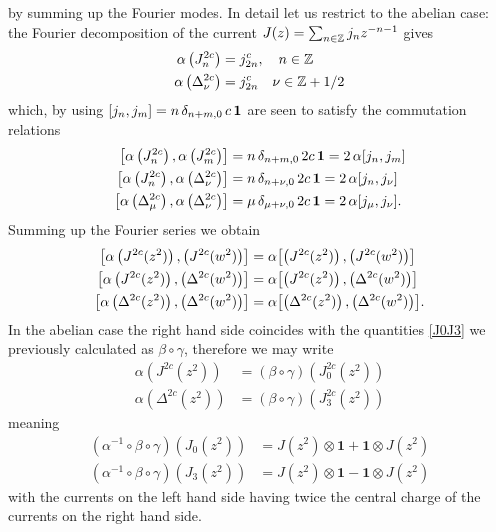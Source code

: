  by summing up the Fourier modes. In detail let us 
 restrict to the abelian case: the Fourier decomposition
 of the current $J(z)=\sum_{n\in\mathbb{Z}}j_n z^{-n-1}$ gives
 \begin{align*}
 \alpha\left(J^{2c}_n\right)&=j_{2n}^c,\quad n\in\mathbb{Z}\\
 \alpha\left(\Delta^{2c}_{\nu}\right)&=j_{2n}^c\quad 
 \nu\in\mathbb{Z}+1/2
 \end{align*}
 which, by using $[j_n,j_m]=n\,\delta_{n+m,0}\,c\,\bm{1}$ are
 seen to satisfy the commutation relations
 \begin{align*}
 \comm*{\alpha\left(J^{2c}_n\right),\alpha\left(J^{2c}_m\right)}
 &= n\,\delta_{n+m,0}\,2c\,\bm{1} = 2\,\alpha\comm*{j_n,j_m}\\
 \comm*{\alpha\left(J^{2c}_n\right),
 \alpha\left(\Delta^{2c}_{\nu}\right)}
 &= n\,\delta_{n+\nu,0}\,2c\,\bm{1} = 2\,\alpha\comm*{j_n,j_{\nu}}\\
 \comm*{\alpha\left(\Delta^{2c}_{\mu}\right),
 \alpha\left(\Delta^{2c}_{\nu}\right)}
 &= \mu\,\delta_{\mu+\nu,0}\,2c\,\bm{1} = 
 2\,\alpha\comm*{j_{\mu},j_{\nu}}.
 \end{align*}
 Summing up the Fourier series we obtain
 \begin{align*}
 \comm*{\alpha\left(J^{2c}(z^2)\right),\left(J^{2c}(w^2)\right)}&
 =\alpha\comm*{\left(J^{2c}(z^2)\right),\left(J^{2c}(w^2)\right)}\\
 \comm*{\alpha\left(J^{2c}(z^2)\right),\left(\Delta^{2c}(w^2)\right)}&
 =\alpha\comm*{\left(J^{2c}(z^2)\right),\left(\Delta^{2c}(w^2)\right)}\\
 \comm*{\alpha\left(\Delta^{2c}(z^2)\right),\left(\Delta^{2c}(w^2)\right)}&
 =\alpha\comm*{\left(\Delta^{2c}(z^2)\right),\left(\Delta^{2c}(w^2)\right)}.
 \end{align*} 
 In the abelian case
 the right hand side coincides with the quantities \eqref{J0J3} 
 we previously calculated as $\beta\circ\gamma$, therefore we
 may write 
 \begin{align*}
 \alpha\left(J^{2c}(z^2)\right)&=\left(\beta\circ\gamma\right) 
                                 \left(J_0^{2c}(z^2)\right)\\
 \alpha\left(\Delta^{2c}(z^2)\right)&=\left(\beta\circ\gamma\right) 
                                 \left(J_3^{2c}(z^2)\right)
 \end{align*}
 meaning
 \begin{align}
 \left(\alpha^{-1}\circ\beta\circ\gamma\right)\left(J_0(z^2)\right)&=
 J(z^2)\otimes\bm{1}+\bm{1}\otimes J(z^2)\\
 \left(\alpha^{-1}\circ\beta\circ\gamma\right)\left(J_3(z^2)\right)&=
 J(z^2)\otimes\bm{1}-\bm{1}\otimes J(z^2)
 \end{align}
 with the currents on the left hand side having twice the central
 charge of the currents on the right hand side.
 
